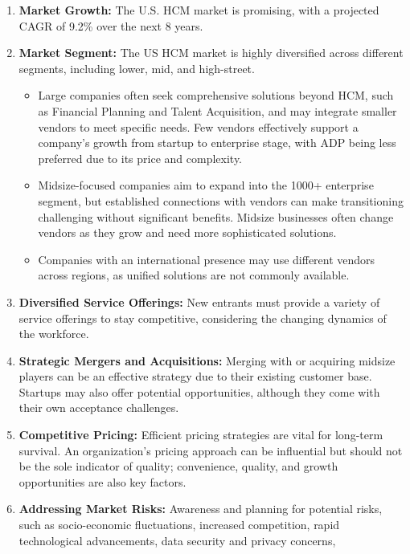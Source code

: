 \documentclass[
  a4paper,
]{book}
\providecommand{\tightlist}{%
  \setlength{\itemsep}{0pt}\setlength{\parskip}{0pt}}\usepackage{longtable,booktabs,array}
\renewcommand{\labelenumi}{\textbf{\textcolor{com-color}{\arabic*.}}}%
\begin{document}
\begin{enumerate}
\def\labelenumi{\arabic{enumi}.}
\item
  \textbf{Market Growth:} The U.S. HCM market is promising, with a
  projected CAGR of 9.2\% over the next 8 years.
\item
  \textbf{Market Segment:} The US HCM market is highly diversified
  across different segments, including lower, mid, and high-street.

  \begin{itemize}
  \tightlist
  \item
    Large companies often seek comprehensive solutions beyond HCM, such
    as Financial Planning and Talent Acquisition, and may integrate
    smaller vendors to meet specific needs. Few vendors effectively
    support a company's growth from startup to enterprise stage, with
    ADP being less preferred due to its price and complexity.
  \item
    Midsize-focused companies aim to expand into the 1000+ enterprise
    segment, but established connections with vendors can make
    transitioning challenging without significant benefits. Midsize
    businesses often change vendors as they grow and need more
    sophisticated solutions.
  \item
    Companies with an international presence may use different vendors
    across regions, as unified solutions are not commonly available.
  \end{itemize}
\item
  \textbf{Diversified Service Offerings:} New entrants must provide a
  variety of service offerings to stay competitive, considering the
  changing dynamics of the workforce.
\item
  \textbf{Strategic Mergers and Acquisitions:} Merging with or acquiring
  midsize players can be an effective strategy due to their existing
  customer base. Startups may also offer potential opportunities,
  although they come with their own acceptance challenges.
\item
  \textbf{Competitive Pricing:} Efficient pricing strategies are vital
  for long-term survival. An organization's pricing approach can be
  influential but should not be the sole indicator of quality;
  convenience, quality, and growth opportunities are also key factors.
\item
  \textbf{Addressing Market Risks:} Awareness and planning for potential
  risks, such as socio-economic fluctuations, increased competition,
  rapid technological advancements, data security and privacy concerns,

\end{enumerate}
\end{document}
